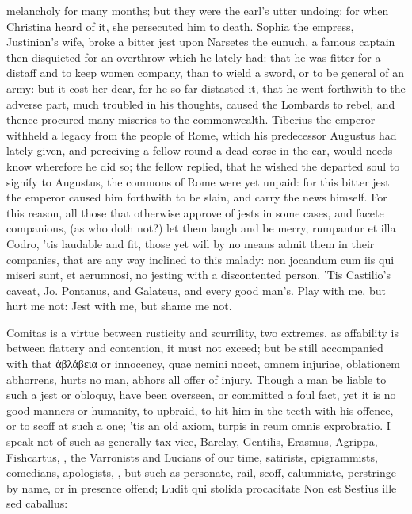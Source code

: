 {melancholy for many months; but they were the earl's utter undoing: for
when Christina heard of it, she persecuted him to death. Sophia the
empress, Justinian's wife, broke a bitter jest upon Narsetes the
eunuch, a famous captain then disquieted for an overthrow which he
lately had: that he was fitter for a distaff and to keep women company,
than to wield a sword, or to be general of an army: but it cost her
dear, for he so far distasted it, that he went forthwith to the adverse
part, much troubled in his thoughts, caused the Lombards to rebel, and
thence procured many miseries to the commonwealth. Tiberius the emperor
withheld a legacy from the people of Rome, which his predecessor
Augustus had lately given, and perceiving a fellow round a dead corse
in the ear, would needs know wherefore he did so; the fellow replied,
that he wished the departed soul to signify to Augustus, the commons of
Rome were yet unpaid: for this bitter jest the emperor caused him
forthwith to be slain, and carry the news himself. For this reason, all
those that otherwise approve of jests in some cases, and facete
companions, (as who doth not?) let them laugh and be merry, rumpantur
et illa Codro, 'tis laudable and fit, those yet will by no means admit
them in their companies, that are any way inclined to this malady: non
jocandum cum iis qui miseri sunt, et aerumnosi, no jesting with a
discontented person. 'Tis Castilio's caveat, Jo. Pontanus, and
Galateus, and every good man's.
Play with me, but hurt me not:
Jest with me, but shame me not.

Comitas is a virtue between rusticity and scurrility, two extremes, as
affability is between flattery and contention, it must not exceed; but
be still accompanied with that \textgreek[variant=ancient]{ἀβλάβεια} or innocency, quae nemini
nocet, omnem injuriae, oblationem abhorrens, hurts no man, abhors all
offer of injury. Though a man be liable to such a jest or obloquy, have
been overseen, or committed a foul fact, yet it is no good manners or
humanity, to upbraid, to hit him in the teeth with his offence, or to
scoff at such a one; 'tis an old axiom, turpis in reum omnis
exprobratio. I speak not of such as generally tax vice, Barclay,
Gentilis, Erasmus, Agrippa, Fishcartus, \etc{}, the Varronists and Lucians
of our time, satirists, epigrammists, comedians, apologists, \etc{}, but
such as personate, rail, scoff, calumniate, perstringe by name, or in
presence offend;
Ludit qui stolida procacitate
Non est Sestius ille sed caballus:

}
